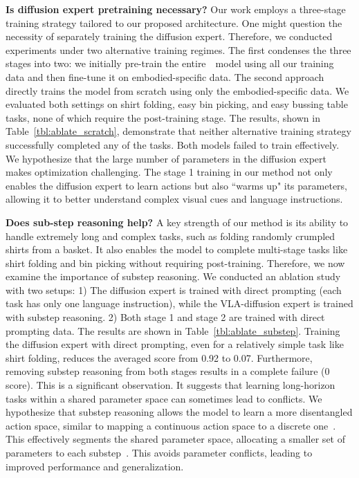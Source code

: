 \textbf{Is diffusion expert pretraining necessary?} Our work employs a three-stage training strategy tailored to our proposed architecture. One might question the necessity of separately training the diffusion expert.  Therefore, we conducted experiments under two alternative training regimes.  The first condenses the three stages into two: we initially pre-train the entire~\methodname~model using all our training data and then fine-tune it on embodied-specific data. The second approach directly trains the model from scratch using only the embodied-specific data.  We evaluated both settings on shirt folding, easy bin picking, and easy bussing table tasks, none of which require the post-training stage. The results, shown in Table~\ref{tbl:ablate_scratch}, demonstrate that neither alternative training strategy successfully completed any of the tasks.  Both models failed to train effectively. We hypothesize that the large number of parameters in the diffusion expert makes optimization challenging.  The stage 1 training in our method not only enables the diffusion expert to learn actions but also ``warms up" its parameters, allowing it to better understand complex visual cues and language instructions.

\textbf{Does sub-step reasoning help?} A key strength of our method is its ability to handle extremely long and complex tasks, such as folding randomly crumpled shirts from a basket.  It also enables the model to complete multi-stage tasks like shirt folding and bin picking without requiring post-training.  Therefore, we now examine the importance of substep reasoning. We conducted an ablation study with two setups: 1) The diffusion expert is trained with direct prompting (each task has only one language instruction), while the VLA-diffusion expert is trained with substep reasoning. 2) Both stage 1 and stage 2 are trained with direct prompting data.  The results are shown in Table~\ref{tbl:ablate_substep}. Training the diffusion expert with direct prompting, even for a relatively simple task like shirt folding, reduces the averaged score from 0.92 to 0.07.  Furthermore, removing substep reasoning from both stages results in a complete failure (0 score). This is a significant observation. It suggests that learning long-horizon tasks within a shared parameter space can sometimes lead to conflicts. We hypothesize that substep reasoning allows the model to learn a more disentangled action space, similar to mapping a continuous action space to a discrete one~\cite{wu2024discrete}. This effectively segments the shared parameter space, allocating a smaller set of parameters to each substep~\cite{wang2023fleet, wang2024poco, wang2024scaling}. This avoids parameter conflicts, leading to improved performance and generalization.